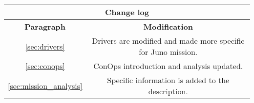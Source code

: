 \begin{table}[H]
    \renewcommand{\arraystretch}{1.5}
    \centering
    \begin{tabular}{|c|c|}
        \hline
        \multicolumn{2}{|c|}{\textbf{Change log}}  \\
        \hline
        \hline
        \textbf{Paragraph} & \textbf{Modification} \\ 
        \hline
		\autoref{sec:drivers} & Drivers are modified and made more specific for Juno mission. \\
		\hline
		\autoref{sec:conops} & ConOps introduction and analysis updated. \\
		\hline
		\autoref{sec:mission_analysis} & Specific information is added to the description.\\        
        \hline
    \end{tabular}
\end{table}

\pagebreak